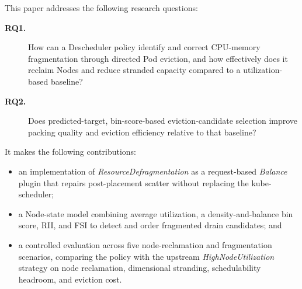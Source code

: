 This paper addresses the following research questions:

\begin{description}
    \item[\textbf{RQ1.}] How can a Descheduler policy identify and correct CPU-memory fragmentation through directed Pod eviction, and how effectively does it reclaim Nodes and reduce stranded capacity compared to a utilization-based baseline?
    \item[\textbf{RQ2.}] Does predicted-target, bin-score-based eviction-candidate selection improve packing quality and eviction efficiency relative to that baseline?
\end{description}

It makes the following contributions:

\begin{itemize}
    \item an implementation of \textit{ResourceDefragmentation} as a request-based \textit{Balance} plugin that repairs post-placement scatter without replacing the kube-scheduler;
    \item a Node-state model combining average utilization, a density-and-balance bin score, RII, and FSI to detect and order fragmented drain candidates; and
    \item a controlled evaluation across five node-reclamation and fragmentation scenarios, comparing the policy with the upstream \textit{HighNodeUtilization} strategy on node reclamation, dimensional stranding, schedulability headroom, and eviction cost.
\end{itemize}
